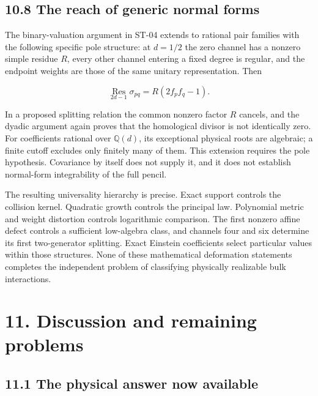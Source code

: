 \hypertarget{the-reach-of-generic-normal-forms}{%
\subsection{10.8 The reach of generic normal forms}\label{the-reach-of-generic-normal-forms}}

The binary-valuation argument in ST-04 extends to rational pair families with the following specific pole structure: at \(d=1/2\) the zero channel has a nonzero simple residue \(R\), every other channel entering a fixed degree is regular, and the endpoint weights are those of the same unitary representation. Then

\[
\operatorname*{Res}_{2d-1}\sigma_{pq}
=R(2f_pf_q-1).
\]

In a proposed splitting relation the common nonzero factor \(R\) cancels, and the dyadic argument again proves that the homological divisor is not identically zero. For coefficients rational over \(\mathbb Q(d)\), its exceptional physical roots are algebraic; a finite cutoff excludes only finitely many of them. This extension requires the pole hypothesis. Covariance by itself does not supply it, and it does not establish normal-form integrability of the full pencil.

The resulting universality hierarchy is precise. Exact support controls the collision kernel. Quadratic growth controls the principal law. Polynomial metric and weight distortion controls logarithmic comparison. The first nonzero affine defect controls a sufficient low-algebra class, and channels four and six determine its first two-generator splitting. Exact Einstein coefficients select particular values within those structures. None of these mathematical deformation statements completes the independent problem of classifying physically realizable bulk interactions.

\clearpage
\hypertarget{discussion-and-remaining-problems}{%
\section{11. Discussion and remaining problems}\label{discussion-and-remaining-problems}}

\hypertarget{the-physical-answer-now-available}{%
\subsection{11.1 The physical answer now available}\label{the-physical-answer-now-available}}

